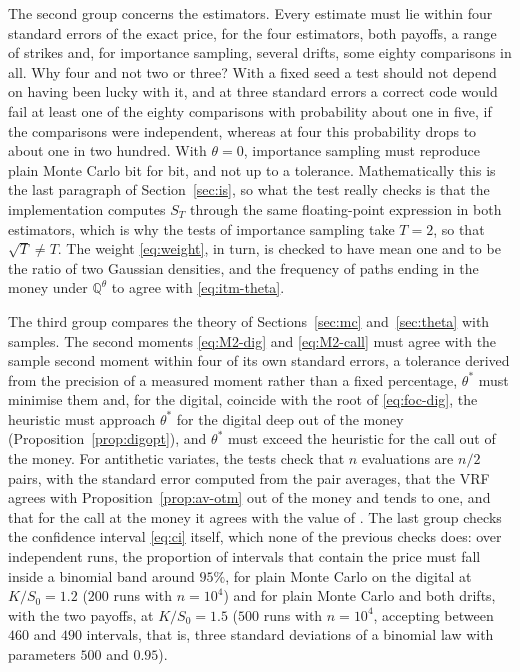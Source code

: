 \documentclass[11pt,a4paper]{article}
\theoremstyle{plain}
\theoremstyle{definition}
\theoremstyle{remark}
\newcommand{\Q}{\mathbb{Q}}
\newcommand{\1}{\mathbf{1}}
\newcommand{\Qt}{\Q^{\theta}}
\begin{document}
The second group concerns the estimators. Every estimate must lie within four standard errors of the exact price, for the four estimators, both payoffs, a range of strikes and, for importance sampling, several drifts, some eighty comparisons in all. Why four and not two or three? With a fixed seed a test should not depend on having been lucky with it, and at three standard errors a correct code would fail at least one of the eighty comparisons with probability about one in five, if the comparisons were independent, whereas at four this probability drops to about one in two hundred. With $\theta = 0$, importance sampling must reproduce plain Monte Carlo bit for bit, and not up to a tolerance. Mathematically this is the last paragraph of Section~\ref{sec:is}, so what the test really checks is that the implementation computes $S_T$ through the same floating-point expression in both estimators, which is why the tests of importance sampling take $T = 2$, so that $\sqrt T \ne T$. The weight \eqref{eq:weight}, in turn, is checked to have mean one and to be the ratio of two Gaussian densities, and the frequency of paths ending in the money under $\Qt$ to agree with \eqref{eq:itm-theta}.

The third group compares the theory of Sections~\ref{sec:mc} and~\ref{sec:theta} with samples. The second moments \eqref{eq:M2-dig} and \eqref{eq:M2-call} must agree with the sample second moment within four of its own standard errors, a tolerance derived from the precision of a measured moment rather than a fixed percentage, $\theta^*$ must minimise them and, for the digital, coincide with the root of \eqref{eq:foc-dig}, the heuristic must approach $\theta^*$ for the digital deep out of the money (Proposition~\ref{prop:digopt}), and $\theta^*$ must exceed the heuristic for the call out of the money. For antithetic variates, the tests check that $n$ evaluations are $n/2$ pairs, with the standard error computed from the pair averages, that the VRF agrees with Proposition~\ref{prop:av-otm} out of the money and tends to one, and that for the call at the money it agrees with the value of \cite{portfolio}. The last group checks the confidence interval \eqref{eq:ci} itself, which none of the previous checks does: over independent runs, the proportion of intervals that contain the price must fall inside a binomial band around $95\%$, for plain Monte Carlo on the digital at $K/S_0 = 1.2$ ($200$ runs with $n = 10^4$) and for plain Monte Carlo and both drifts, with the two payoffs, at $K/S_0 = 1.5$ ($500$ runs with $n = 10^4$, accepting between $460$ and $490$ intervals, that is, three standard deviations of a binomial law with parameters $500$ and $0.95$).
\end{document}
